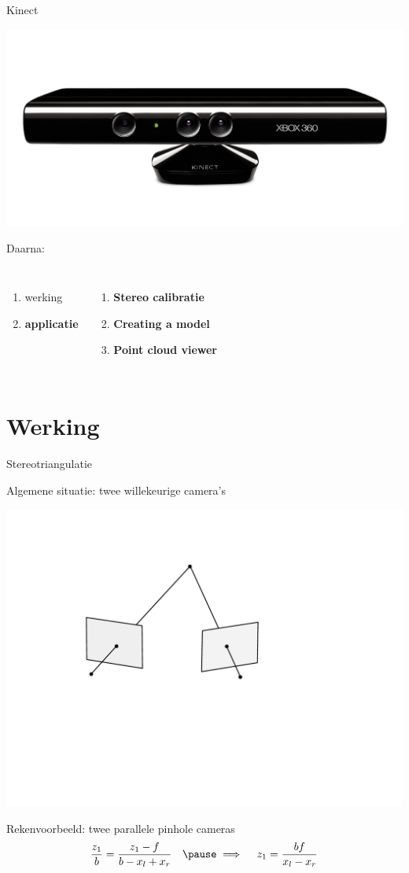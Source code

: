 \documentclass{beamer}
\begin{document}
\begin{frame}{Kinect}{}
\centerline{
\includegraphics[scale=0.3, viewport= 40 120 1190 460, clip=true]{kinect.jpg}
}
\vfill
Daarna:\\
\begin{columns}
\begin{enumerate}
\item werking
\item \textbf{applicatie}
\end{enumerate}
\begin{enumerate}
\item \textbf{Stereo calibratie}
\item \textbf{Creating a model}
\item \textbf{Point cloud viewer}
\end{enumerate}
\end{columns}
\end{frame}

\section{Werking}
\begin{frame}{Stereotriangulatie}

{\large Algemene situatie: twee willekeurige camera's}

\centerline{\includegraphics[scale=0.4, clip=true, viewport= 120 230 470 470]{triang}}
\vfill
\pause
{\large Rekenvoorbeeld: twee parallele pinhole cameras}
\pause
$$
\frac{z_1}{b} = \frac{z_1 - f}{b-x_l+x_r}\quad \pause\implies\quad z_1 = \frac {bf} {x_l - x_r}
$$
\end{frame}
\end{document}
